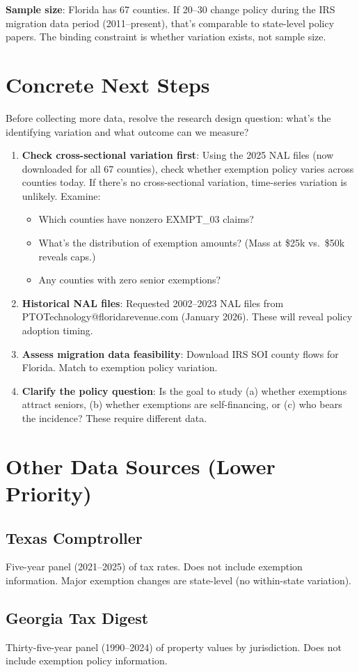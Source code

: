 \documentclass[11pt]{article}
\begin{document}
\textbf{Sample size}: Florida has 67 counties. If 20--30 change policy during the IRS migration data period (2011--present), that's comparable to state-level policy papers. The binding constraint is whether variation exists, not sample size.

\section{Concrete Next Steps}

Before collecting more data, resolve the research design question: what's the identifying variation and what outcome can we measure?

\begin{enumerate}
    \item \textbf{Check cross-sectional variation first}: Using the 2025 NAL files (now downloaded for all 67 counties), check whether exemption policy varies across counties today. If there's no cross-sectional variation, time-series variation is unlikely. Examine:
    \begin{itemize}
        \item Which counties have nonzero EXMPT\_03 claims?
        \item What's the distribution of exemption amounts? (Mass at \$25k vs.\ \$50k reveals caps.)
        \item Any counties with zero senior exemptions?
    \end{itemize}

    \item \textbf{Historical NAL files}: Requested 2002--2023 NAL files from PTOTechnology@floridarevenue.com (January 2026). These will reveal policy adoption timing.

    \item \textbf{Assess migration data feasibility}: Download IRS SOI county flows for Florida. Match to exemption policy variation.

    \item \textbf{Clarify the policy question}: Is the goal to study (a) whether exemptions attract seniors, (b) whether exemptions are self-financing, or (c) who bears the incidence? These require different data.
\end{enumerate}

\section{Other Data Sources (Lower Priority)}

\subsection{Texas Comptroller}

Five-year panel (2021--2025) of tax rates. Does not include exemption information. Major exemption changes are state-level (no within-state variation).

\subsection{Georgia Tax Digest}

Thirty-five-year panel (1990--2024) of property values by jurisdiction. Does not include exemption policy information.
\end{document}
